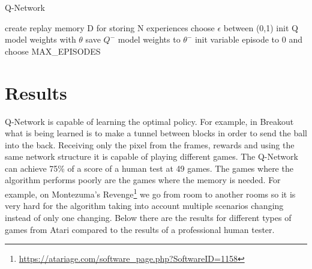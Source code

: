\begin{algorithm}
	\caption{Q-Network} \label{sgd-code}
	\begin{algorithmic}[1]
		\State create replay memory D for storing N experiences
		\State choose $\epsilon$ between (0,1)
		\State init Q model weights with $\theta$
		\State save $Q^-$ model weights to $\theta^-$
		\State init variable episode to 0 and choose MAX_EPISODES
		\EndWhile

		
	\end{algorithmic}
\end{algorithm}

\newpage


\section{Results}

Q-Network is capable of learning the optimal policy. For example, in Breakout what is being learned is to make a tunnel between blocks in order to send the ball into the back. Receiving only the pixel from the frames, rewards and using the same network structure it is capable of playing different games. The Q-Network can achieve 75\% of a score of a human test at 49 games\cite{nature}. The games where the algorithm performs poorly are the games where the memory is needed. For example, on Montezuma's Revenge\footnote{\url{https://atariage.com/software_page.php?SoftwareID=1158}} we go from room to another rooms so it is very hard for the algorithm taking into account multiple scenarios changing instead of only one changing. Below there are the results for different types of games from Atari compared to the results of a professional human tester.


